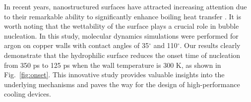 In recent years, nanostructured surfaces have attracted increasing attention due to their remarkable ability to significantly enhance boiling heat transfer \cite{kim2015,chen2019}. It is worth noting that the wettability of the surface plays a crucial role in bubble nucleation. In this study, molecular dynamics simulations were performed for argon on copper walls with contact angles of 35$^\circ$ and 110$^\circ$. Our results clearly demonstrate that the hydrophilic surface reduces the onset time of nucleation from 350 ps to 125 ps when the wall temperature is 300 K, as shown in Fig.~\ref{fig:onset}. This innovative study provides valuable insights into the underlying mechanisms and paves the way for the design of high-performance cooling devices.
